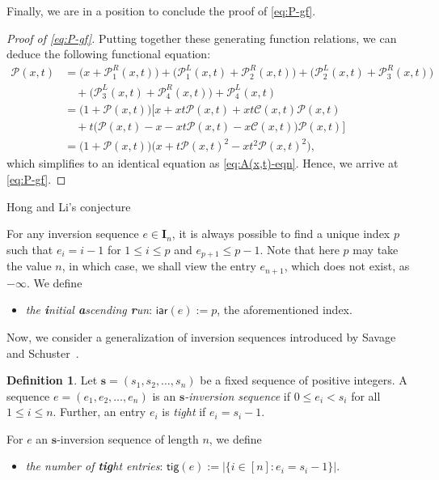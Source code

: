 \documentclass[reqno]{amsart}
\makeatletter
\numberwithin{equation}{section}
\theoremstyle{plain}
\theoremstyle{definition}
\newtheorem{definition}{Definition}[section]
\theoremstyle{named}
\def\section{\@startsection{section}{1}%
  \z@{.7\linespacing\@plus\linespacing}{.5\linespacing}%
  {\normalfont\scshape}}%
\newcommand{\bs}{\mathbf{s}}
\newcommand{\bI}{\mathbf{I}}
\newcommand{\iar}{\mathsf{iar}}
\newcommand{\tig}{\mathsf{tig}}
\newcommand{\cC}{\mathcal{C}}
\newcommand{\cP}{\mathcal{P}}
\makeatother
\begin{document}
Finally, we are in a position to conclude the proof of \eqref{eq:P-gf}.

\begin{proof}[Proof of \eqref{eq:P-gf}]
	Putting together these generating function relations, we can deduce the following functional equation:
	\begin{align*}
		\cP(x,t) &= \big(x+\cP_1^R(x,t)\big)+\big(\cP_1^L(x,t)+\cP_2^R(x,t)\big)+\big(\cP_2^L(x,t)+\cP_3^R(x,t)\big)\\
		&\quad+\big(\cP_3^L(x,t)+\cP_4^R(x,t)\big)+\cP_4^L(x,t)\\
		&= \big(1+\cP(x,t)\big)\big[x+xt \cP(x,t)+xt \cC(x,t)\cP(x,t)\\
		&\quad+t\big(\cP(x,t)-x-xt\cP(x,t)-x\cC(x,t)\big)\cP(x,t)\big]\\
		&= \big(1+\cP(x,t)\big)\big(x+t\cP(x,t)^2-xt^2\cP(x,t)^2\big),
	\end{align*}
	which simplifies to an identical equation as \eqref{eq:A(x,t)-eqn}. Hence, we arrive at \eqref{eq:P-gf}.
\end{proof}

\section{Hong and Li's conjecture}

For any inversion sequence $e\in\bI_n$, it is always possible to find a unique index $p$ such that $e_i=i-1$ for $1\le i\le p$ and $e_{p+1}\le p-1$. Note that here $p$ may take the value $n$, in which case, we shall view the entry $e_{n+1}$, which does not exist, as $-\infty$. We define
\begin{itemize}[leftmargin=*,align=left]
	\renewcommand{\labelitemi}{$\triangleright$}
	\item \textit{the \textbf{i}nitial \textbf{a}scending \textbf{r}un}: $\iar(e):=p$, the aforementioned index.
\end{itemize}

Now, we consider a generalization of  inversion sequences introduced by Savage and  Schuster~\cite{SS2012}.

\begin{definition}
	Let $\bs=(s_1,s_2,\ldots,s_n)$ be a fixed sequence of positive integers. A sequence $e=(e_1,e_2,\ldots,e_n)$ is an \textit{$\bs$-inversion sequence} if $0\le e_i<s_i$ for all $1\le i\le n$. Further, an entry $e_i$ is \textit{tight} if $e_i=s_i-1$.
\end{definition}

For $e$ an $\bs$-inversion sequence of length $n$, we define
\begin{itemize}[leftmargin=*,align=left]
	\renewcommand{\labelitemi}{$\triangleright$}
	\item \textit{the number of \textbf{tig}ht entries}: $\tig(e):=|\{i\in[n]:e_i=s_i-1\}|$.
\end{itemize}
\end{document}
